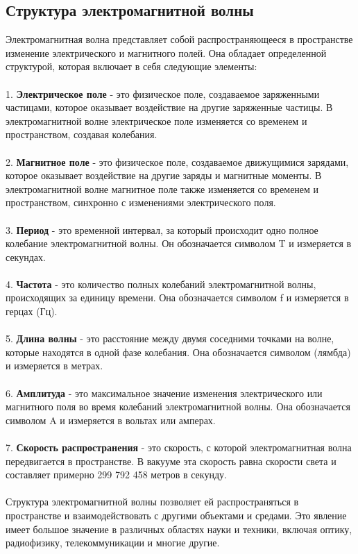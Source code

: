 \documentclass{article}
\begin{document}
\subsection{Структура электромагнитной волны}
Электромагнитная волна представляет собой распространяющееся в пространстве изменение электрического и магнитного полей. Она обладает определенной структурой, которая включает в себя следующие элементы:\\
~\\
1. \textbf{Электрическое поле} - это физическое поле, создаваемое заряженными частицами, которое оказывает воздействие на другие заряженные частицы. В электромагнитной волне электрическое поле изменяется со временем и пространством, создавая колебания.\\
~\\
2. \textbf{Магнитное поле} - это физическое поле, создаваемое движущимися зарядами, которое оказывает воздействие на другие заряды и магнитные моменты. В электромагнитной волне магнитное поле также изменяется со временем и пространством, синхронно с изменениями электрического поля.\\
~\\
3. \textbf{Период} - это временной интервал, за который происходит одно полное колебание электромагнитной волны. Он обозначается символом T и измеряется в секундах.\\
~\\
4. \textbf{Частота} - это количество полных колебаний электромагнитной волны, происходящих за единицу времени. Она обозначается символом f и измеряется в герцах (Гц).\\
~\\
5. \textbf{Длина волны} - это расстояние между двумя соседними точками на волне, которые находятся в одной фазе колебания. Она обозначается символом  (лямбда) и измеряется в метрах.\\
~\\
6. \textbf{Амплитуда} - это максимальное значение изменения электрического или магнитного поля во время колебаний электромагнитной волны. Она обозначается символом A и измеряется в вольтах или амперах.\\
~\\
7. \textbf{Скорость распространения} - это скорость, с которой электромагнитная волна передвигается в пространстве. В вакууме эта скорость равна скорости света и составляет примерно 299 792 458 метров в секунду.\\
~\\
Структура электромагнитной волны позволяет ей распространяться в пространстве и взаимодействовать с другими объектами и средами. Это явление имеет большое значение в различных областях науки и техники, включая оптику, радиофизику, телекоммуникации и многие другие.
\end{document}
